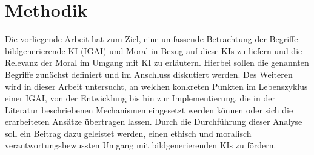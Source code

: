 \section{Methodik}
Die vorliegende Arbeit hat zum Ziel, eine umfassende Betrachtung der Begriffe 
bildgenerierende KI (IGAI) und Moral in 
Bezug auf diese KIs zu liefern und die Relevanz der Moral im Umgang mit KI
zu erläutern. Hierbei sollen die genannten Begriffe zunächst definiert und im Anschluss diskutiert werden. 
Des Weiteren wird in dieser Arbeit untersucht, an welchen konkreten 
Punkten im Lebenszyklus einer IGAI, von der Entwicklung bis hin zur 
Implementierung, die in der Literatur beschriebenen Mechanismen eingesetzt 
werden können oder sich die erarbeiteten Ansätze übertragen lassen. 
Durch die Durchführung dieser Analyse soll ein Beitrag dazu geleistet 
werden, einen ethisch und moralisch verantwortungsbewussten Umgang mit 
bildgenerierenden KIs zu fördern.
